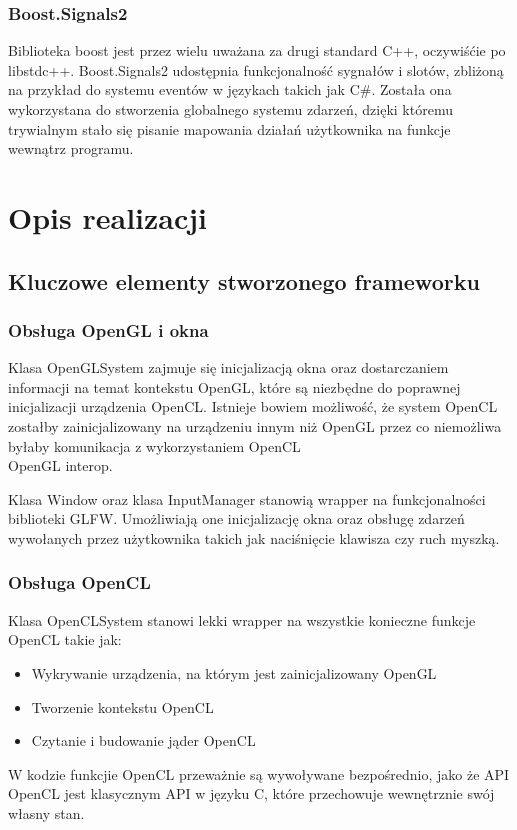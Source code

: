 \documentclass[polish, 12pt]{aghthesis}
\begin{document}
\subsubsection*{Boost.Signals2}
			 Biblioteka boost jest przez wielu uważana za drugi standard C++, oczywiśćie po libstdc++. Boost.Signals2 udostępnia funkcjonalność sygnałów i slotów, zbliżoną na przykład do systemu eventów w językach takich jak C\#. Została ona wykorzystana do stworzenia globalnego systemu zdarzeń, dzięki któremu trywialnym stało się pisanie mapowania działań użytkownika na funkcje wewnątrz programu. 


\section{Opis realizacji}

	\subsection{Kluczowe elementy stworzonego frameworku}
		\subsubsection{Obsługa OpenGL i okna}
			Klasa OpenGLSystem zajmuje się inicjalizacją okna oraz dostarczaniem informacji na temat kontekstu OpenGL, które są niezbędne do poprawnej inicjalizacji urządzenia OpenCL. Istnieje bowiem możliwość, że system OpenCL zostałby zainicjalizowany na urządzeniu innym niż OpenGL przez co niemożliwa byłaby komunikacja z wykorzystaniem OpenCL\\OpenGL interop.
			
			Klasa Window oraz klasa InputManager stanowią wrapper na funkcjonalności biblioteki GLFW. Umożliwiają one inicjalizację okna oraz obsługę zdarzeń wywołanych przez użytkownika takich jak naciśnięcie klawisza czy ruch myszką. 
			
		\subsubsection{Obsługa OpenCL}
			Klasa OpenCLSystem stanowi lekki wrapper na wszystkie konieczne funkcje OpenCL takie jak:
			\begin{itemize}
				\item Wykrywanie urządzenia, na którym jest zainicjalizowany OpenGL
				\item Tworzenie kontekstu OpenCL
				\item Czytanie i budowanie jąder OpenCL
			\end{itemize}
			W kodzie funkcjie OpenCL przeważnie są wywoływane bezpośrednio, jako że API OpenCL jest klasycznym API w języku C, które przechowuje wewnętrznie swój własny stan.
			
\end{document}

